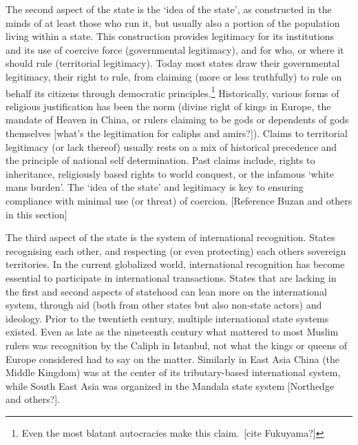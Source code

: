 \documentclass[12pt]{article}
\begin{document}
The second aspect of the state is the `idea of the state', as constructed in
the minds of at least those who run it, but usually also a portion of the
population living within a state. This construction provides legitimacy for its
institutions and its use of coercive force (governmental legitimacy), and for
who, or where it should rule (territorial legitimacy). Today most states draw
their governmental legitimacy, their right to rule, from claiming (more or less
truthfully) to rule on behalf its citizens through democratic
principles.\footnote{Even the most blatant autocracies make this claim. [cite
Fukuyama?]} Historically, various forms of religious justification has been the
norm (divine right of kings in Europe, the mandate of Heaven in China, or rulers
claiming to be gods or dependents of gods themselves [what's the legitimation
for caliphs and amirs?]). Claims to territorial legitimacy (or lack thereof)
usually rests on a mix of historical precedence and the principle of national
self determination. Past claims include, rights to inheritance, religiously
based rights to world conquest, or the infamous `white mans burden'. The
`idea of the state' and legitimacy is key to ensuring compliance with minimal
use (or threat) of coercion. [Reference Buzan and others in this section]

The third aspect of the state is the system of international recognition. States
recognising each other, and respecting (or even protecting) each others
sovereign territories. In the current globalized world, international
recognition has become essential to participate in international transactions.
States that are lacking in the first and second aspects of statehood can lean
more on the international system, through aid (both from other states but also
non-state actors) and ideology. Prior to the twentieth century, multiple
international state systems existed. Even as late as the nineteenth century what
mattered to most Muslim rulers was recognition by the Caliph in Istanbul, not
what the kings or queens of Europe considered had to say on the matter.
Similarly in East Asia China (the Middle Kingdom) was at the center of its
tributary-based international system, while South East Asia was organized in the
Mandala state system [Northedge and others?].
\end{document}
